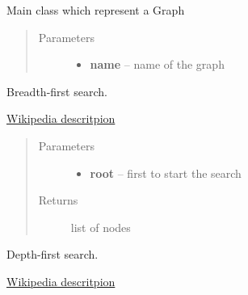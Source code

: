 \documentclass[letterpaper,10pt,english]{sphinxmanual}
\begin{document}
\begin{fulllineitems}
\label{reference:Graph.Graph}
Main class which represent a Graph
\begin{quote}\begin{description}
\item[{Parameters}] \leavevmode\begin{itemize}
\item {} 
\textbf{name} -- name of the graph

\end{itemize}

\end{description}\end{quote}

\begin{fulllineitems}
\label{reference:Graph.Graph.BFS}
Breadth-first search.




\href{http://en.wikipedia.org/wiki/Breadth-first\_search}{Wikipedia descritpion}


\begin{quote}\begin{description}
\item[{Parameters}] \leavevmode\begin{itemize}
\item {} 
\textbf{root} -- first to start the search

\end{itemize}

\item[{Returns}] \leavevmode
list of nodes

\end{description}\end{quote}

\end{fulllineitems}


\begin{fulllineitems}
\label{reference:Graph.Graph.DFS_prefix}
Depth-first search.




\href{http://en.wikipedia.org/wiki/Depth-first\_search}{Wikipedia descritpion}



\end{fulllineitems}
\end{fulllineitems}
\end{document}
